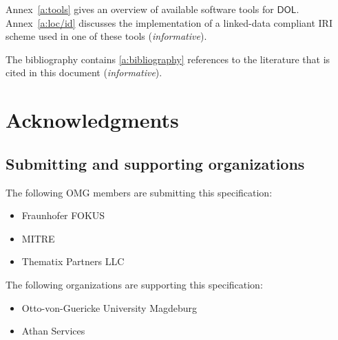 \documentclass[10pt,fleqn,final]{scrreprt}
\newcommand*{\DOL}{\ensuremath{\mathsf{DOL}}\xspace}
\newenvironment{definitions}[0]{\medskip }{}
\begin{document}
\begin{definitions}
Annex~\ref{a:tools} gives an overview of available  software tools for
\DOL.  Annex~\ref{a:loc/id} discusses the implementation of a
linked-data compliant IRI scheme used in one of these tools
(\emph{informative}).

\medskip \noindent 
The bibliography contains \ref{a:bibliography} references to the literature that is cited in this document
(\emph{informative}).





\section{Acknowledgments}
\subsection{Submitting and supporting organizations}
The following  OMG  members are submitting this specification:
	\begin{itemize}
		\item Fraunhofer FOKUS
		\item MITRE		
		\item Thematix Partners LLC
	\end{itemize}
The following organizations are supporting this specification: 
	\begin{itemize}
		\item Otto-von-Guericke University Magdeburg 
		\item Athan Services 
	\end{itemize}





\end{definitions}
\end{document}
